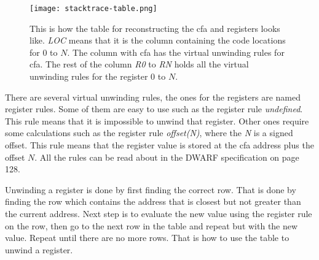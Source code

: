 \begin{figure}[h]
	\centering
	\texttt{[image: stacktrace-table.png]}
	\caption{This is how the table for reconstructing the \gls{cfa} and registers looks like. \emph{LOC} means that it is the column containing the code locations for $0$ to $N$. The column with \gls{cfa} has the virtual unwinding rules for \gls{cfa}. The rest of the column \emph{R0} to \emph{RN} holds all the virtual unwinding rules for the register $0$ to $N$.}
	\label{fig:stacktracetable}
\end{figure}


There are several virtual unwinding rules, the ones for the registers are named register rules.
Some of them are easy to use such as the register rule \emph{undefined}.
This rule means that it is impossible to unwind that register.
Other ones require some calculations such as the register rule \emph{offset(N)}, where the \emph{N} is a signed offset.
This rule means that the register value is stored at the \gls{cfa} address plus the offset $N$.
All the rules can be read about in the \gls{DWARF} specification \cite{dwarf} on page 128.


Unwinding a register is done by first finding the correct row.
That is done by finding the row which contains the address that is closest but not greater than the current address.
Next step is to evaluate the new value using the register rule on the row, then go to the next row in the table and repeat but with the new value.
Repeat until there are no more rows.
That is how to use the table to unwind a register.
